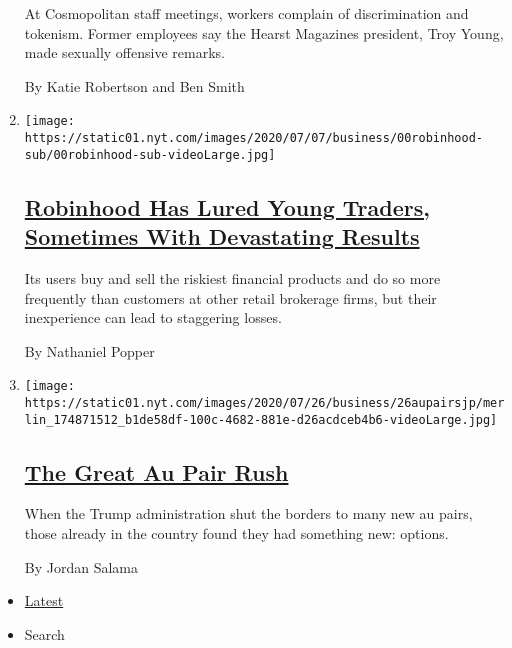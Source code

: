 \begin{enumerate}
  At Cosmopolitan staff meetings, workers complain of discrimination and
  tokenism. Former employees say the Hearst Magazines president, Troy
  Young, made sexually offensive remarks.

  By Katie Robertson and Ben Smith
\item
  \texttt{[image: https://static01.nyt.com/images/2020/07/07/business/00robinhood-sub/00robinhood-sub-videoLarge.jpg]}

  \hypertarget{robinhood-has-lured-young-traders-sometimes-with-devastating-results}{%
  \subsection{\texorpdfstring{\href{/2020/07/08/technology/robinhood-risky-trading.html}{Robinhood
  Has Lured Young Traders, Sometimes With Devastating
  Results}}{Robinhood Has Lured Young Traders, Sometimes With Devastating Results}}\label{robinhood-has-lured-young-traders-sometimes-with-devastating-results}}

  Its users buy and sell the riskiest financial products and do so more
  frequently than customers at other retail brokerage firms, but their
  inexperience can lead to staggering losses.

  By Nathaniel Popper
\item
  \texttt{[image: https://static01.nyt.com/images/2020/07/26/business/26aupairsjp/merlin\_174871512\_b1de58df-100c-4682-881e-d26acdceb4b6-videoLarge.jpg]}

  \hypertarget{the-great-au-pair-rush}{%
  \subsection{\texorpdfstring{\href{/2020/07/25/business/the-great-au-pair-rush.html}{The
  Great Au Pair
  Rush}}{The Great Au Pair Rush}}\label{the-great-au-pair-rush}}

  When the Trump administration shut the borders to many new au pairs,
  those already in the country found they had something new: options.

  By Jordan Salama
\end{enumerate}

\begin{itemize}
\tightlist
\item
  \protect\hyperlink{stream-panel}{Latest}
\item
  Search
\end{itemize}

